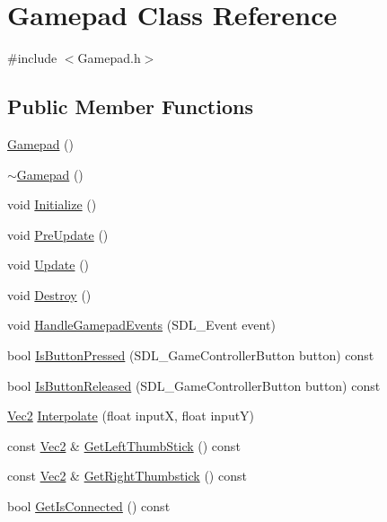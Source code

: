 \hypertarget{class_gamepad}{}\section{Gamepad Class Reference}
\label{class_gamepad}


{\ttfamily \#include $<$Gamepad.\+h$>$}

\subsection*{Public Member Functions}
\begin{DoxyCompactItemize}
\item 
\mbox{\hyperlink{class_gamepad_a766fe5c4b0971cd755f7c930ede3c068}{Gamepad}} ()
\item 
\mbox{\hyperlink{class_gamepad_a5d488c36c656a0f52787671b9b156822}{$\sim$\+Gamepad}} ()
\item 
void \mbox{\hyperlink{class_gamepad_a265afcd224a5f19b76b70c4a27b43cf3}{Initialize}} ()
\item 
void \mbox{\hyperlink{class_gamepad_aa53820795fc6ae0c38b495f90e730fa7}{Pre\+Update}} ()
\item 
void \mbox{\hyperlink{class_gamepad_aade3185158726ef97b588f8c58cb9f8e}{Update}} ()
\item 
void \mbox{\hyperlink{class_gamepad_ad37c0c811ab6d486c64a27ec518d8ec9}{Destroy}} ()
\item 
void \mbox{\hyperlink{class_gamepad_a864978b3a8913f60ac17addb092e07be}{Handle\+Gamepad\+Events}} (S\+D\+L\+\_\+\+Event event)
\item 
bool \mbox{\hyperlink{class_gamepad_a247cbc78f48a4a87c95c5f4909b466c7}{Is\+Button\+Pressed}} (S\+D\+L\+\_\+\+Game\+Controller\+Button button) const
\item 
bool \mbox{\hyperlink{class_gamepad_a1e0c5e44c5fa4a871eb1dcff1a47a44e}{Is\+Button\+Released}} (S\+D\+L\+\_\+\+Game\+Controller\+Button button) const
\item 
\mbox{\hyperlink{struct_vec2}{Vec2}} \mbox{\hyperlink{class_gamepad_a60cd7249f68b8898173f3182d1570563}{Interpolate}} (float inputX, float inputY)
\item 
const \mbox{\hyperlink{struct_vec2}{Vec2}} \& \mbox{\hyperlink{class_gamepad_ac1ae9a32b9f5e64a7a6bd0b05699b112}{Get\+Left\+Thumb\+Stick}} () const
\item 
const \mbox{\hyperlink{struct_vec2}{Vec2}} \& \mbox{\hyperlink{class_gamepad_adbb39f23d58e544d26e11dcca0fd0134}{Get\+Right\+Thumbstick}} () const
\item 
bool \mbox{\hyperlink{class_gamepad_a78ca5ad8203c0c77e7a2b8782e780234}{Get\+Is\+Connected}} () const
\end{DoxyCompactItemize}


